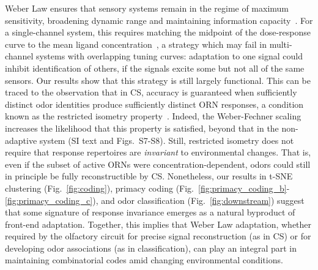\documentclass[10pt,prl,aps,showpacs,twocolumn,unsortedaddress]{revtex4-1}
\begin{document}
Weber Law ensures that sensory systems remain in the regime of maximum sensitivity, broadening dynamic range and maintaining information capacity~\cite{adaptation_fairhall}.
For a single-channel system, this requires matching the midpoint of the dose-response curve to the mean ligand concentration~\cite{information_theory_adaptation}, a strategy which may fail in multi-channel systems with overlapping tuning curves: adaptation to one signal could inhibit identification of others, if the signals excite some but not all of the same sensors. 
Our results show that this strategy is still largely functional. This can be traced to the observation that in CS, accuracy is guaranteed when sufficiently distinct odor identities produce sufficiently distinct ORN responses, a condition known as the restricted isometry property~\cite{CS_tao}. Indeed, the Weber-Fechner scaling increases the likelihood that this property  is satisfied, beyond that in the non-adaptive system (SI text and Figs.~S7-S8). Still, restricted isometry does not require that response repertoires are \textit{invariant} to environmental changes. That is, even if the subset of active ORNs were concentration-dependent, odors could still in principle be fully reconstructible by CS.
Nonetheless, our results in t-SNE clustering (Fig.~\ref{fig:coding}), primacy coding  (Fig.~\ref{fig:primacy_coding_b}-\ref{fig:primacy_coding_c}), and odor classification (Fig.~\ref{fig:downstream}) suggest that some signature of response invariance emerges as a natural byproduct of front-end adaptation. Together, this implies that Weber Law adaptation, whether required by the olfactory circuit for precise signal reconstruction (as in CS) or for developing odor associations (as in classification), can play an integral part in maintaining combinatorial codes amid changing environmental conditions.


\end{document}
